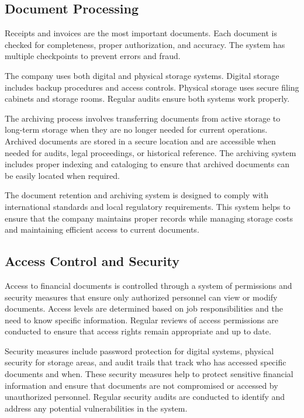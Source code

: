 \subsection{Document Processing}
Receipts and invoices are the most important documents. Each document is checked for completeness, proper authorization, and accuracy. The system has multiple checkpoints to prevent errors and fraud.

The company uses both digital and physical storage systems. Digital storage includes backup procedures and access controls. Physical storage uses secure filing cabinets and storage rooms. Regular audits ensure both systems work properly.

The archiving process involves transferring documents from active storage to long-term storage when they are no longer needed for current operations. Archived documents are stored in a secure location and are accessible when needed for audits, legal proceedings, or historical reference. The archiving system includes proper indexing and cataloging to ensure that archived documents can be easily located when required.

The document retention and archiving system is designed to comply with international standards and local regulatory requirements. This system helps to ensure that the company maintains proper records while managing storage costs and maintaining efficient access to current documents.

\subsection{Access Control and Security}
Access to financial documents is controlled through a system of permissions and security measures that ensure only authorized personnel can view or modify documents. Access levels are determined based on job responsibilities and the need to know specific information. Regular reviews of access permissions are conducted to ensure that access rights remain appropriate and up to date.

Security measures include password protection for digital systems, physical security for storage areas, and audit trails that track who has accessed specific documents and when. These security measures help to protect sensitive financial information and ensure that documents are not compromised or accessed by unauthorized personnel. Regular security audits are conducted to identify and address any potential vulnerabilities in the system.

